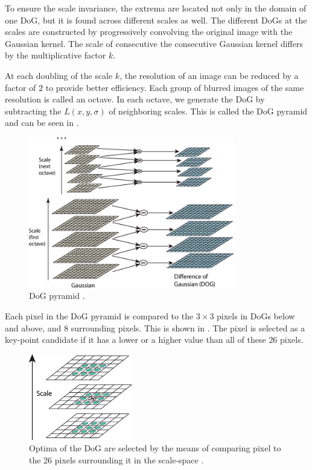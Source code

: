 To ensure the scale invariance, the extrema are located not only in the domain of one DoG, but it is found across different scales as well. The different DoGs at the scales are constructed by progressively convolving the original image with the Gaussian kernel. The scale of consecutive the consecutive Gaussian kernel differs by the multiplicative factor $k$.

At each doubling of the scale $k$, the resolution of an image can be reduced by a factor of $2$ to provide better efficiency. Each group of blurred images of the same resolution is called an octave. In each octave, we generate the DoG by subtracting the $L(x, y, \sigma)$ of neighboring scales. This is called the DoG pyramid and can be seen in .

\begin{figure}[!ht]
    \centering
    \includegraphics[width=0.8\textwidth]{Figures/sift/pyramid.jpg}
    \caption[DoG pyramid]{DoG pyramid \cite{Lowe2004}.}
    \label{fig:DoG_pyramid}
\end{figure}

Each pixel in the DoG pyramid is compared to the $3\times3$ pixels in DoGs below and above, and $8$ surrounding pixels. This is shown in . The pixel is selected as a key-point candidate if it has a lower or a higher value than all of these $26$ pixels.

\begin{figure}[!ht]
    \centering
    \includegraphics[width=0.4\textwidth]{Figures/sift/extrema.jpg}
    \caption[Optima of the DoG are selected by the means of comparing pixel to the 26 pixels surrounding it in the scale-space]{Optima of the DoG are selected by the means of comparing pixel to the 26 pixels surrounding it in the scale-space \cite{Lowe2004}.}
    \label{fig:DoG_extrema}
\end{figure}

